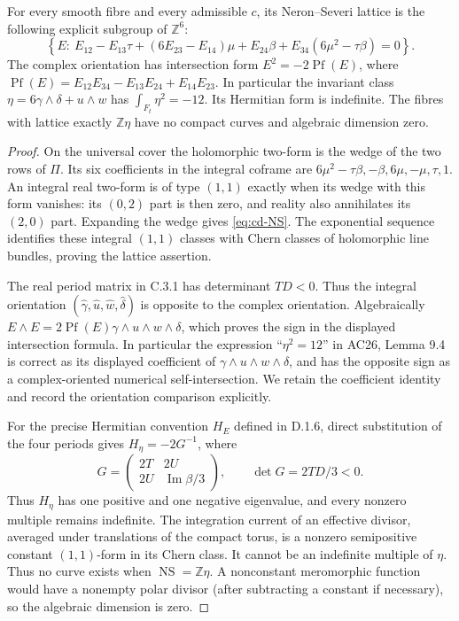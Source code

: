 \begin{proposition}[D.1.4; Proved]\label{st:D.1.4}
For every smooth fibre and every admissible \(c\), its Neron--Severi lattice
is the following explicit subgroup of \(\mathbb Z^6\):
\begin{equation}\label{eq:cd-NS}
 \left\{E:\ E_{12}-E_{13}\tau+(6E_{23}-E_{14})\mu+
 E_{24}\beta+E_{34}(6\mu^2-\tau\beta)=0\right\}.
\end{equation}
The complex orientation has intersection form
\(E^2=-2\operatorname{Pf}(E)\), where
\(\operatorname{Pf}(E)=E_{12}E_{34}-E_{13}E_{24}+E_{14}E_{23}\).
In particular the invariant class \(\eta=6\gamma\wedge\delta+u\wedge w\)
has \(\int_{F_t}\eta^2=-12\). Its Hermitian form is indefinite.
The fibres with lattice exactly \(\mathbb Z\eta\) have no compact curves
and algebraic dimension zero.
\end{proposition}
\begin{proof}
On the universal cover the holomorphic two-form is the wedge of the two
rows of \(\Pi\). Its six coefficients in the integral coframe are
\(6\mu^2-\tau\beta,-\beta,6\mu,-\mu,\tau,1\).
An integral real two-form is of type \((1,1)\) exactly when its wedge
with this form vanishes: its \((0,2)\) part is then zero, and reality
also annihilates its \((2,0)\) part. Expanding the wedge gives
\eqref{eq:cd-NS}. The exponential sequence identifies these integral
\((1,1)\) classes with Chern classes of holomorphic line bundles, proving
the lattice assertion.

The real period matrix in C.3.1 has determinant \(TD<0\). Thus the
integral orientation \((\widehat\gamma,\widehat u,\widehat w,
\widehat\delta)\) is opposite to the complex orientation. Algebraically
\(E\wedge E=2\operatorname{Pf}(E)\gamma\wedge u\wedge w\wedge\delta\),
which proves the sign in the displayed intersection formula. In
particular the expression ``\(\eta^2=12\)'' in AC26, Lemma 9.4 is correct
as its displayed coefficient of \(\gamma\wedge u\wedge w\wedge\delta\),
and has the opposite sign as a complex-oriented numerical
self-intersection. We retain the coefficient identity and record the
orientation comparison explicitly.

For the precise Hermitian convention $H_E$ defined in D.1.6, direct
substitution of the four periods gives $H_\eta=-2G^{-1}$, where
\[
 G=\begin{pmatrix}2T&2U\\2U&\operatorname{Im}\beta/3\end{pmatrix},
 \qquad \det G=2TD/3<0.
\]
Thus $H_\eta$ has one positive and one negative eigenvalue, and every
nonzero multiple remains indefinite. The integration
current of an effective divisor, averaged under translations of the
compact torus, is a nonzero semipositive constant \((1,1)\)-form in its
Chern class. It cannot be an indefinite multiple of \(\eta\).
Thus no curve exists when \(\operatorname{NS}=\mathbb Z\eta\).
A nonconstant meromorphic function would have a nonempty polar divisor
(after subtracting a constant if necessary), so the algebraic dimension
is zero.
\end{proof}

